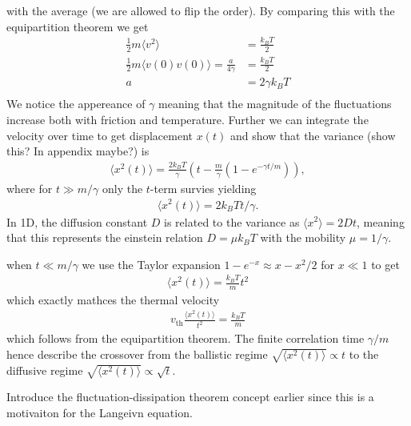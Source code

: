 with the average (we are allowed to flip the order). By comparing this with the
equipartition theorem we get 
\begin{align*}
  \frac{1}{2}m\langle  v^2 \rangle &= \frac{k_BT}{2} \\
  \frac{1}{2}m\langle  v(0) v(0) \rangle = \frac{a}{4\gamma} &= \frac{k_BT}{2} \\
  a &=  2\gamma k_B T \\
\end{align*}
We notice the appereance of $\gamma$ meaning that the magnitude of the
fluctuations increase both with friction and temperature. Further we can
integrate the velocity over time to get displacement $x(t)$ and show that the
variance (show this? In appendix maybe?) is 
\begin{align*}
  \big\langle x^2(t) \big\rangle = \frac{2 k_B T}{\gamma} \left(t - \frac{m}{\gamma}\left(1 - e^{-\gamma t/m} \right) \right),
\end{align*}
where for $t \gg m/\gamma$ only the $t$-term survies yielding
\begin{align*}
  \langle x^2(t) \rangle = 2 k_BTt/\gamma.
\end{align*}
In 1D, the diffusion constant $D$ is related to the variance as $\langle x^2
\rangle = 2Dt$, meaning that this represents the einstein relation $D = \mu k_B
T$ with the mobility $\mu = 1/\gamma$.

when $t \ll m/\gamma$ we use the Taylor expansion $1 - e^{-x} \approx x - x^2/2$
for $x\ll 1$ to get 
\begin{align*}
  \big\langle x^2(t) \big\rangle = \frac{k_B T}{m} t^2
\end{align*}
which exactly mathces the thermal velocity
\begin{align*}
  v_{\text{th}} \frac{\big\langle x^2(t) \big\rangle}{t^2} = \frac{k_B T}{m}
\end{align*}
which follows from the equipartition theorem. The finite correlation time
$\gamma/m$ hence describe the crossover from the ballistic regime $\sqrt{\langle
x^2(t) \rangle} \propto t$ to the diffusive regime $\sqrt{\langle x^2(t)
\rangle} \propto \sqrt{t}$.

Introduce the fluctuation-dissipation theorem concept earlier since this is a
motivaiton for the Langeivn equation. 



